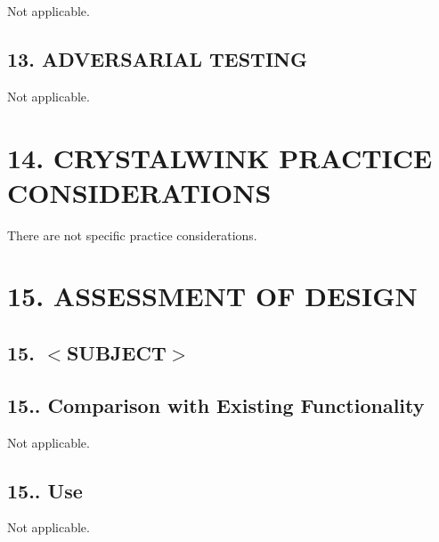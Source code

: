 \begin{DoxyVerb}Not applicable.
\end{DoxyVerb}
\hypertarget{index_sec_13_5}{}\subsection{13.	\+A\+D\+V\+E\+R\+S\+A\+R\+I\+A\+L T\+E\+S\+T\+I\+N\+G}\label{index_sec_13_5}
\begin{DoxyVerb}Not applicable.
\end{DoxyVerb}
\hypertarget{index_sec_14}{}\section{14.	\+C\+R\+Y\+S\+T\+A\+L\+W\+I\+N\+K P\+R\+A\+C\+T\+I\+C\+E C\+O\+N\+S\+I\+D\+E\+R\+A\+T\+I\+O\+N\+S}\label{index_sec_14}
\begin{DoxyVerb}There are not specific practice considerations.
\end{DoxyVerb}
\hypertarget{index_sec_15}{}\section{15.	\+A\+S\+S\+E\+S\+S\+M\+E\+N\+T O\+F D\+E\+S\+I\+G\+N}\label{index_sec_15}
\hypertarget{index_sec_15_1}{}\subsection{15.	$<$\+S\+U\+B\+J\+E\+C\+T$>$}\label{index_sec_15_1}
\hypertarget{index_sec_15_1_1}{}\subsection{15..	\+Comparison with Existing Functionality}\label{index_sec_15_1_1}
\begin{DoxyVerb}Not applicable.
\end{DoxyVerb}
\hypertarget{index_sec_15_1_2}{}\subsection{15..	\+Use}\label{index_sec_15_1_2}
\begin{DoxyVerb}Not applicable.\end{DoxyVerb}
 